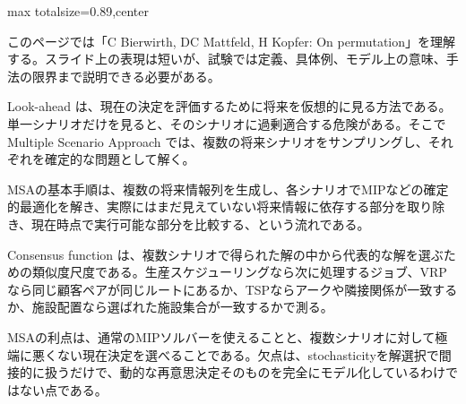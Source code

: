 \begin{minipage}[t]{0.58\textwidth}
\begin{adjustbox}{max totalsize={\textwidth}{0.89\textheight},center}
\begin{minipage}{\textwidth}\scriptsize
{}このページでは「C Bierwirth, DC Mattfeld, H Kopfer: On permutation」を理解する。スライド上の表現は短いが、試験では定義、具体例、モデル上の意味、手法の限界まで説明できる必要がある。\par
Look-ahead は、現在の決定を評価するために将来を仮想的に見る方法である。単一シナリオだけを見ると、そのシナリオに過剰適合する危険がある。そこで Multiple Scenario Approach では、複数の将来シナリオをサンプリングし、それぞれを確定的な問題として解く。\par
MSAの基本手順は、複数の将来情報列を生成し、各シナリオでMIPなどの確定的最適化を解き、実際にはまだ見えていない将来情報に依存する部分を取り除き、現在時点で実行可能な部分を比較する、という流れである。\par
Consensus function は、複数シナリオで得られた解の中から代表的な解を選ぶための類似度尺度である。生産スケジューリングなら次に処理するジョブ、VRPなら同じ顧客ペアが同じルートにあるか、TSPならアークや隣接関係が一致するか、施設配置なら選ばれた施設集合が一致するかで測る。\par
MSAの利点は、通常のMIPソルバーを使えることと、複数シナリオに対して極端に悪くない現在決定を選べることである。欠点は、stochasticityを解選択で間接的に扱うだけで、動的な再意思決定そのものを完全にモデル化しているわけではない点である。\par

\end{minipage}
\end{adjustbox}
\end{minipage}
